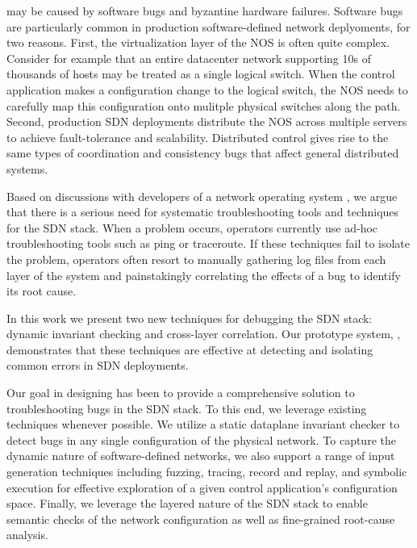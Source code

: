  may be caused by software bugs and
byzantine hardware failures. Software bugs are particularly common in
production software-defined network deplyoments, for two reasons. First, the
virtualization layer of the NOS is often quite complex. Consider for example
that an entire datacenter network supporting 10s of thousands of hosts may be
treated as a single logical switch. When the control application makes a
configuration change to the logical switch, the NOS needs to carefully map this
configuration onto mulitple physical switches along the path. Second,
production SDN deployments distribute the NOS across multiple servers to achieve fault-tolerance
and scalability. Distributed control gives rise to the same types of coordination
and consistency bugs that affect general distributed systems.


Based on discussions with developers of a network operating system
\cite{Nicira}, we argue that there is a serious need for systematic troubleshooting
tools and techniques for the SDN stack. When a problem occurs,
operators currently use ad-hoc troubleshooting tools such as ping or traceroute.
If these techniques fail to isolate the problem, operators often resort to
manually gathering log files from each layer of the system and painstakingly
correlating the effects of a bug to identify its root cause.

In this work we present two new techniques for debugging the SDN stack:
dynamic invariant checking and cross-layer correlation. Our prototype system,
\projectname{}, demonstrates that these techniques are effective at detecting and
isolating common errors in SDN deployments.

Our goal in designing \projectname{} has been to provide a comprehensive solution to
troubleshooting bugs in the SDN stack. To this end, we
leverage existing techniques whenever possible. We utilize a static dataplane invariant
checker \cite{anteater} to detect bugs in any single configuration of the
physical network. To capture the dynamic nature of software-defined networks,
we also support a range of input generation techniques including fuzzing, tracing, record and
replay, and symbolic execution for effective exploration of a given control
application's configuration space. Finally, we leverage the layered nature of the
SDN stack to enable semantic checks of the network configuration  as
well as fine-grained root-cause analysis.

